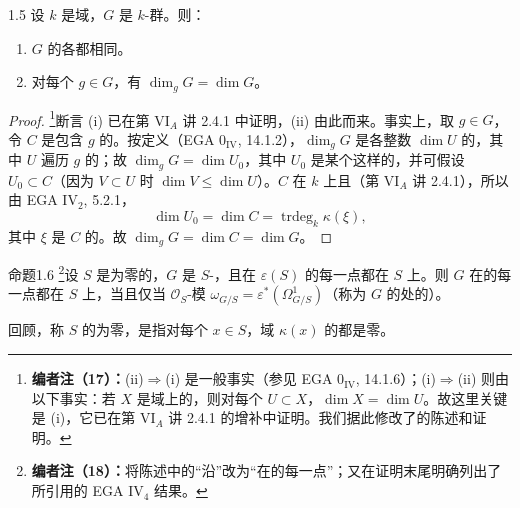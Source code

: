 \begin{SGAresult}{}{1.5}
设 $k$ 是域，$G$ 是 $k$-群。则：
\begin{enumerate}
\item[(i)] $G$ 的各都相同。
\item[(ii)] 对每个 $g\in G$，有 $\dim_gG=\dim G$。
\end{enumerate}
\end{SGAresult}
\begin{proof}
\footnote{\textbf{编者注（17）：}(ii)$\Rightarrow$(i) 是一般事实（参见 EGA 0$_{\mathrm{IV}}$, 14.1.6）；(i)$\Rightarrow$(ii) 则由以下事实：若 $X$ 是域上的，则对每个 $U\subset X$，$\dim X=\dim U$。故这里关键是 (i)，它已在第 VI$_A$ 讲 2.4.1 的增补中证明。我们据此修改了的陈述和证明。}断言 (i) 已在第 VI$_A$ 讲 2.4.1 中证明，(ii) 由此而来。事实上，取 $g\in G$，令 $C$ 是包含 $g$ 的。按定义（EGA 0$_{\mathrm{IV}}$, 14.1.2），$\dim_gG$ 是各整数 $\dim U$ 的，其中 $U$ 遍历 $g$ 的；故 $\dim_gG=\dim U_0$，其中 $U_0$ 是某个这样的，并可假设 $U_0\subset C$（因为 $V\subset U$ 时 $\dim V\leq\dim U$）。$C$ 在 $k$ 上且（第 VI$_A$ 讲 2.4.1），所以由 EGA IV$_2$, 5.2.1，
\[
\dim U_0=\dim C=\operatorname{trdeg}_k\kappa(\xi),
\]
其中 $\xi$ 是 $C$ 的。故 $\dim_gG=\dim C=\dim G$。
\end{proof}
\begin{SGAresult}{命题}{1.6}
\footnote{\textbf{编者注（18）：}将陈述中的“沿”改为“在的每一点”；又在证明末尾明确列出了所引用的 EGA IV$_4$ 结果。}设 $S$ 是为零的，$G$ 是 $S$-，且在 $\varepsilon(S)$ 的每一点都在 $S$ 上。则 $G$ 在的每一点都在 $S$ 上，当且仅当 $\mathcal O_S$-模 $\omega_{G/S}=\varepsilon^*(\Omega^1_{G/S})$（称为 $G$ 的处的）。
\end{SGAresult}
回顾，称 $S$ 的为零，是指对每个 $x\in S$，域 $\kappa(x)$ 的都是零。

